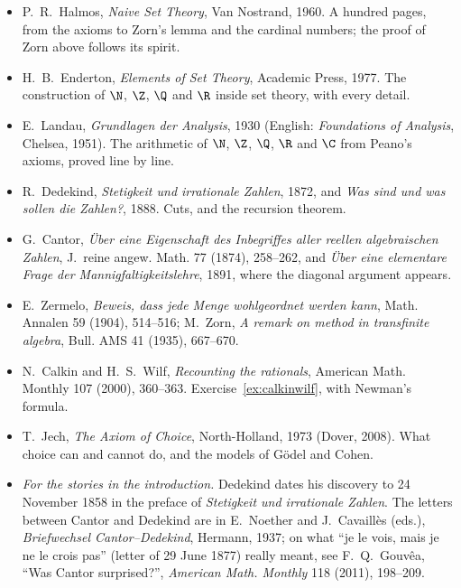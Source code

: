 \begin{itemize}
\item P.~R.~Halmos, \emph{Naive Set Theory}, Van Nostrand, 1960. A hundred pages, from the axioms to Zorn's lemma and the
cardinal numbers; the proof of Zorn above follows its spirit.
\item H.~B.~Enderton, \emph{Elements of Set Theory}, Academic Press, 1977. The construction of $\N$, $\Z$, $\Q$ and $\R$ inside set theory,
with every detail.
\item E.~Landau, \emph{Grundlagen der Analysis}, 1930 (English: \emph{Foundations of Analysis}, Chelsea, 1951). The arithmetic of
$\N$, $\Z$, $\Q$, $\R$ and $\C$ from Peano's axioms, proved line by line.
\item R.~Dedekind, \emph{Stetigkeit und irrationale Zahlen}, 1872, and \emph{Was sind und was sollen die Zahlen?}, 1888. Cuts, and the
recursion theorem.
\item G.~Cantor, \emph{\"Uber eine Eigenschaft des Inbegriffes aller reellen algebraischen Zahlen}, J.~reine angew. Math. 77
(1874), 258--262, and \emph{\"Uber eine elementare Frage der Mannigfaltigkeitslehre}, 1891, where the diagonal argument appears.
\item E.~Zermelo, \emph{Beweis, dass jede Menge wohlgeordnet werden kann}, Math. Annalen 59 (1904), 514--516; M.~Zorn, \emph{A remark
on method in transfinite algebra}, Bull. AMS 41 (1935), 667--670.
\item N.~Calkin and H.~S.~Wilf, \emph{Recounting the rationals}, American Math. Monthly 107 (2000), 360--363. Exercise~\ref{ex:calkinwilf}, with
Newman's formula.
\item T.~Jech, \emph{The Axiom of Choice}, North-Holland, 1973 (Dover, 2008). What choice can and cannot do, and the models of
G\"odel and Cohen.
\item \emph{For the stories in the introduction.} Dedekind dates his discovery to 24 November 1858 in the preface of \emph{Stetigkeit und irrationale Zahlen}. The letters
between Cantor and Dedekind are in E.~Noether and J.~Cavaill\`es (eds.), \emph{Briefwechsel Cantor--Dedekind}, Hermann, 1937; on what ``je le vois, mais je ne le crois
pas'' (letter of 29 June 1877) really meant, see F.~Q.~Gouv\^ea, ``Was Cantor surprised?'', \emph{American Math. Monthly} 118 (2011), 198--209.
\end{itemize}
